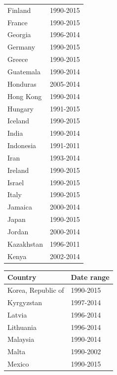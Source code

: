 \documentclass[12pt,a4paper]{article}
\begin{document}
\begin{table}[htbp]
\begin{subtable}{0.45\textwidth}
\begin{tabular}{ll}
                   Finland &  1990-2015 \\
                    France &  1990-2015 \\
                   Georgia &  1996-2014 \\
                   Germany &  1990-2015 \\
                    Greece &  1990-2015 \\
                 Guatemala &  1990-2014 \\
                  Honduras &  2005-2014 \\
                 Hong Kong &  1990-2014 \\
                   Hungary &  1991-2015 \\
                   Iceland &  1990-2015 \\
                     India &  1990-2014 \\
                 Indonesia &  1991-2011 \\
					  Iran &  1993-2014 \\
                   Ireland &  1990-2015 \\
                    Israel &  1990-2015 \\
                     Italy &  1990-2015 \\
                   Jamaica &  2000-2014 \\
                     Japan &  1990-2015 \\
                    Jordan &  2000-2014 \\
                Kazakhstan &  1996-2011 \\
                     Kenya &  2002-2014 \\
\bottomrule
\end{tabular}
\end{subtable}
\begin{subtable}{0.45\textwidth}
\centering
\begin{tabular}{ll}
\toprule
        Country & Date range \\
\midrule
        Korea, Republic of &  1990-2015 \\
                Kyrgyzstan &  1997-2014 \\
                    Latvia &  1996-2014 \\
                 Lithuania &  1996-2014 \\
                  Malaysia &  1990-2014 \\
                     Malta &  1990-2002 \\
                    Mexico &  1990-2015 \\

\end{tabular}
\end{subtable}
\end{table}
\end{document}
